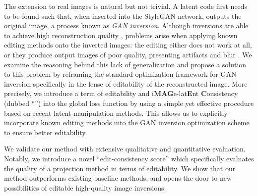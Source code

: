 
The extension to real images is natural but not trivial. A latent code first needs to be 
found such that, when inserted into the StyleGAN network, outputs the original image, a process
known as \emph{GAN inversion}.
Although inversions are able to achieve high reconstruction quality  
\citep{abdal2019image2stylegan, abdal2020}, problems arise when applying known editing methods 
onto the inverted images: the editing either does not work at all, or they produce output 
images of poor quality, presenting artifacts and blur \citep{zhu2020indomain, StyleGAN3D}. 
 We examine the reasoning behind this lack of generalization and propose a solution to this problem 
 by reframing the standard optimization framework for GAN inversion specifically in the lense of 
 editability of the reconstructed image. More precisely, we introduce a term of editability
 and i\textbf{MAG}e-lat\textbf{E}nt \textbf{C}onsistency (dubbed ``\magec'') into the global 
 loss function by using a simple yet effective procedure based on recent latent-manipulation methods.
 This allows us to explicitly incorporate 
 known editing methods into the GAN inversion optimization scheme to ensure better editability.

We validate our method with extensive qualitative and quantitative evaluation. Notably, we 
introduce a novel ``edit-consistency score'' which specifically evaluates the quality of a projection
method in terms of editability. We show that our method outperforms existing baseline methods, and
 opens the door to new possibilities of editable high-quality image inversions.


